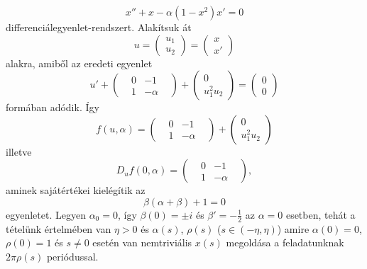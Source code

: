 \documentclass[oneside, titlepage, 12pt, a4paper]{report}
\begin{document}
\begin{equation}
x'' + x - \alpha (1 - x^2) x' = 0
\end{equation}
differenciálegyenlet-rendszert. Alakítsuk át
\begin{equation*}
u =\left(
\begin{array}{c}
u_1 \\
u_2
\end{array}
\right) = \left(
\begin{array}{c}
x \\
x'
\end{array}
\right)
\end{equation*}
alakra, amiből az eredeti egyenlet
\begin{equation*}
u' + \left(
\begin{matrix}
&0& -1& \\
&1& -\alpha&
\end{matrix}
\right) + \left(
\begin{array}{c}
0 \\
u_1^2 u_2
\end{array}
\right) = \left(
\begin{array}{c}
0 \\
0
\end{array}
\right)
\end{equation*}
formában adódik. Így
\begin{equation*}
f(u, \alpha) = \left(
\begin{matrix}
&0& -1& \\
&1& -\alpha&
\end{matrix}
\right) + \left(
\begin{array}{c}
0 \\
u_1^2 u_2
\end{array}
\right)
\end{equation*}
illetve
\begin{equation*}
D_uf(0, \alpha) = \left(
\begin{matrix}
&0& -1& \\
&1& -\alpha&
\end{matrix}
\right),
\end{equation*}
aminek sajátértékei kielégítik az
\begin{equation*}
\beta (\alpha + \beta) + 1 = 0
\end{equation*}
egyenletet.
Legyen $\alpha_0 = 0$, így $\beta(0) = \pm i$ és $\beta' = -\frac{1}{2}$ az $\alpha = 0$ esetben, tehát a tételünk értelmében van $\eta > 0$ és $\alpha(s)$, $\rho(s)$ ($s \in (-\eta, \eta)$) amire $\alpha(0) = 0$, $\rho(0) = 1$ és $s \ne 0$ esetén van nemtriviális $x(s)$ megoldása a feladatunknak $2 \pi \rho(s)$ periódussal.



 

 
\end{document}
